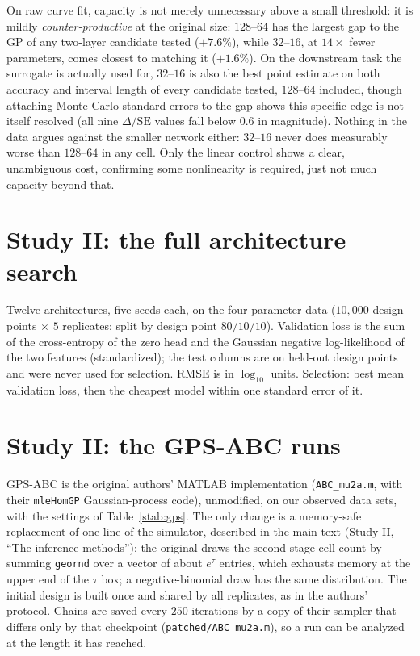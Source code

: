 \documentclass[11pt]{article}
\begin{document}
On raw curve fit, capacity is not merely unnecessary above a small
threshold: it is mildly \emph{counter-productive} at the original size:
$128$--$64$ has the largest gap to the GP of any two-layer candidate tested
($+7.6\%$), while $32$--$16$, at $14\times$ fewer parameters, comes closest to
matching it ($+1.6\%$). On the downstream task the surrogate is actually
used for, $32$--$16$ is also the best point estimate on both accuracy and
interval length of every candidate tested, $128$--$64$ included, though
attaching Monte Carlo standard errors to the gap shows this specific edge is
not itself resolved (all nine $\Delta/\mathrm{SE}$ values fall below $0.6$ in
magnitude). Nothing in the data argues against the smaller network either:
$32$--$16$ never does measurably worse than $128$--$64$ in any cell. Only the
linear control shows a clear, unambiguous cost, confirming some nonlinearity
is required, just not much capacity beyond that.

\section{Study II: the full architecture search}
\label{ssec:s2-arch}

Twelve architectures, five seeds each, on the four-parameter data ($10{,}000$ design points $\times$ $5$ replicates; split by design
point $80/10/10$). Validation loss is the sum of the cross-entropy of the zero head and the Gaussian negative log-likelihood of
the two features (standardized); the test columns are on held-out design points and were never used for selection. RMSE is in
$\log_{10}$ units. Selection: best mean validation loss, then the cheapest model within one standard error of it.

\begin{table}[h]
\centering
\caption{Study II: full architecture search (mean over five seeds; $\pm$ s.d.\ for the validation loss).}
\label{stab:arch4D}
\scriptsize
\scriptsize\setlength{\tabcolsep}{2pt}

\end{table}

\section{Study II: the GPS-ABC runs}
\label{ssec:s3-gps}

GPS-ABC is the original authors' MATLAB implementation (\texttt{ABC\_mu2a.m}, with their \texttt{mleHomGP} Gaussian-process code),
unmodified, on our observed data sets, with the settings of Table~\ref{stab:gps}. The only change is a memory-safe replacement of
one line of the simulator, described in the main text (Study II, ``The inference methods''): the original draws the second-stage
cell count by summing \texttt{geornd} over a vector of about $e^{\tau}$ entries, which exhausts memory at the upper end of the
$\tau$ box; a negative-binomial draw has the same distribution. The initial design is built once and shared by all replicates,
as in the authors' protocol. Chains are saved every $250$ iterations by a copy of their sampler that differs only by that checkpoint (\texttt{patched/ABC\_mu2a.m}), so a run can be analyzed at the length it has reached.
\end{document}
